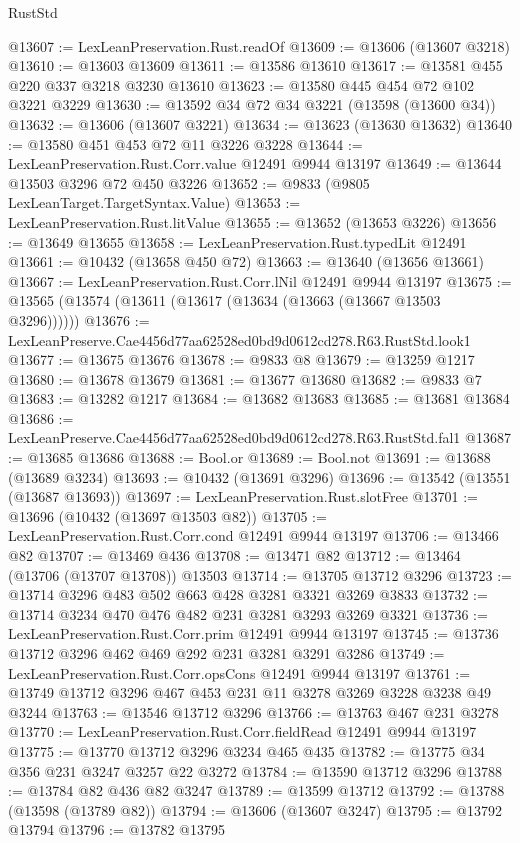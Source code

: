 \begin{lexlean}{RustStd}
\begin{coremodule}
@13607 := LexLeanPreservation.Rust.readOf
@13609 := @13606 (@13607 @3218)
@13610 := @13603 @13609
@13611 := @13586 @13610
@13617 := @13581 @455 @220 @337 @3218 @3230 @13610
@13623 := @13580 @445 @454 @72 @102 @3221 @3229
@13630 := @13592 @34 @72 @34 @3221 (@13598 (@13600 @34))
@13632 := @13606 (@13607 @3221)
@13634 := @13623 (@13630 @13632)
@13640 := @13580 @451 @453 @72 @11 @3226 @3228
@13644 := LexLeanPreservation.Rust.Corr.value @12491 @9944 @13197
@13649 := @13644 @13503 @3296 @72 @450 @3226
@13652 := @9833 (@9805 LexLeanTarget.TargetSyntax.Value)
@13653 := LexLeanPreservation.Rust.litValue
@13655 := @13652 (@13653 @3226)
@13656 := @13649 @13655
@13658 := LexLeanPreservation.Rust.typedLit @12491
@13661 := @10432 (@13658 @450 @72)
@13663 := @13640 (@13656 @13661)
@13667 := LexLeanPreservation.Rust.Corr.lNil @12491 @9944 @13197
@13675 := @13565 (@13574 (@13611 (@13617 (@13634 (@13663 (@13667 @13503 @3296))))))
@13676 := LexLeanPreserve.Cae4456d77aa62528ed0bd9d0612cd278.R63.RustStd.look1
@13677 := @13675 @13676
@13678 := @9833 @8
@13679 := @13259 @1217
@13680 := @13678 @13679
@13681 := @13677 @13680
@13682 := @9833 @7
@13683 := @13282 @1217
@13684 := @13682 @13683
@13685 := @13681 @13684
@13686 := LexLeanPreserve.Cae4456d77aa62528ed0bd9d0612cd278.R63.RustStd.fal1
@13687 := @13685 @13686
@13688 := Bool.or
@13689 := Bool.not
@13691 := @13688 (@13689 @3234)
@13693 := @10432 (@13691 @3296)
@13696 := @13542 (@13551 (@13687 @13693))
@13697 := LexLeanPreservation.Rust.slotFree
@13701 := @13696 (@10432 (@13697 @13503 @82))
@13705 := LexLeanPreservation.Rust.Corr.cond @12491 @9944 @13197
@13706 := @13466 @82
@13707 := @13469 @436
@13708 := @13471 @82
@13712 := @13464 (@13706 (@13707 @13708)) @13503
@13714 := @13705 @13712 @3296
@13723 := @13714 @3296 @483 @502 @663 @428 @3281 @3321 @3269 @3833
@13732 := @13714 @3234 @470 @476 @482 @231 @3281 @3293 @3269 @3321
@13736 := LexLeanPreservation.Rust.Corr.prim @12491 @9944 @13197
@13745 := @13736 @13712 @3296 @462 @469 @292 @231 @3281 @3291 @3286
@13749 := LexLeanPreservation.Rust.Corr.opsCons @12491 @9944 @13197
@13761 := @13749 @13712 @3296 @467 @453 @231 @11 @3278 @3269 @3228 @3238 @49 @3244
@13763 := @13546 @13712 @3296
@13766 := @13763 @467 @231 @3278
@13770 := LexLeanPreservation.Rust.Corr.fieldRead @12491 @9944 @13197
@13775 := @13770 @13712 @3296 @3234 @465 @435
@13782 := @13775 @34 @356 @231 @3247 @3257 @22 @3272
@13784 := @13590 @13712 @3296
@13788 := @13784 @82 @436 @82 @3247
@13789 := @13599 @13712
@13792 := @13788 (@13598 (@13789 @82))
@13794 := @13606 (@13607 @3247)
@13795 := @13792 @13794
@13796 := @13782 @13795

\end{coremodule}
\end{lexlean}
